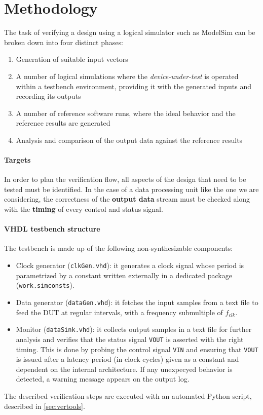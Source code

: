 \section{Methodology}
The task of verifying a design using a logical simulator such as ModelSim can be broken down into four distinct phases:
\begin{enumerate}
    \item Generation of suitable input vectors
    \item A number of logical simulations where the \textit{device-under-test} is operated within a testbench environment, providing it with the generated inputs and recording its outputs
    \item A number of reference software runs, where the ideal behavior and the reference results are generated
    \item Analysis and comparison of the output data against the reference results
\end{enumerate}

\paragraph{Targets} In order to plan the verification flow, all aspects of the design that need to be tested must be identified. In the case of a data processing unit like the one we are considering, the correctness of the \textbf{output data} stream must be checked along with the \textbf{timing} of every control and status signal.

\paragraph{VHDL testbench structure} The testbench is made up of the following non-synthesizable components:
\begin{itemize}
	\item Clock generator (\texttt{clkGen.vhd}): it generates a clock signal whose period is parametrized by a constant written externally in a dedicated package (\texttt{work.simconsts}).
	\item Data generator (\texttt{dataGen.vhd}): it fetches the input samples from a text file to feed the DUT at regular intervals, with a frequency submultiple of $f_{clk}$.
	\item Monitor (\texttt{dataSink.vhd}): it collects output samples in a text file for further analysis and verifies that the status signal \texttt{VOUT} is asserted with the right timing. This is done by probing the control signal \texttt{VIN} and ensuring that \texttt{VOUT} is issued after a latency period (in clock cycles) given as a constant and dependent on the internal architecture. If any unexpecyed behavior is detected, a warning message appears on the output log.
\end{itemize}

The described verification steps are executed with an automated Python script, described in \autoref{sec:vertools}.
